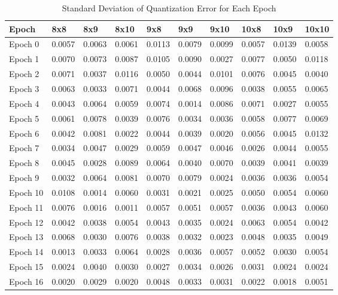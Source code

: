 \begin{table}[htbp]
\centering
\caption{Standard Deviation of Quantization Error for Each Epoch}
\begin{tabular}{|l|l|l|l|l|l|l|l|l|l|}
\hline
Epoch & 8x8 & 8x9 & 8x10 & 9x8 & 9x9 & 9x10 & 10x8 & 10x9 & 10x10 \\
\hline
Epoch 0 & 0.0057 & 0.0063 & 0.0061 & 0.0113 & 0.0079 & 0.0099 & 0.0057 & 0.0139 & 0.0058  \\
Epoch 1 & 0.0070 & 0.0073 & 0.0087 & 0.0105 & 0.0090 & 0.0027 & 0.0077 & 0.0050 & 0.0118  \\
Epoch 2 & 0.0071 & 0.0037 & 0.0116 & 0.0050 & 0.0044 & 0.0101 & 0.0076 & 0.0045 & 0.0040  \\
Epoch 3 & 0.0063 & 0.0033 & 0.0071 & 0.0044 & 0.0068 & 0.0096 & 0.0038 & 0.0055 & 0.0065  \\
Epoch 4 & 0.0043 & 0.0064 & 0.0059 & 0.0074 & 0.0014 & 0.0086 & 0.0071 & 0.0027 & 0.0055  \\
Epoch 5 & 0.0061 & 0.0078 & 0.0039 & 0.0076 & 0.0034 & 0.0036 & 0.0058 & 0.0077 & 0.0069  \\
Epoch 6 & 0.0042 & 0.0081 & 0.0022 & 0.0044 & 0.0039 & 0.0020 & 0.0056 & 0.0045 & 0.0132  \\
Epoch 7 & 0.0034 & 0.0047 & 0.0029 & 0.0059 & 0.0047 & 0.0046 & 0.0026 & 0.0044 & 0.0055  \\
Epoch 8 & 0.0045 & 0.0028 & 0.0089 & 0.0064 & 0.0040 & 0.0070 & 0.0039 & 0.0041 & 0.0039  \\
Epoch 9 & 0.0032 & 0.0064 & 0.0081 & 0.0070 & 0.0079 & 0.0024 & 0.0036 & 0.0036 & 0.0054  \\
Epoch 10 & 0.0108 & 0.0014 & 0.0060 & 0.0031 & 0.0021 & 0.0025 & 0.0050 & 0.0054 & 0.0060  \\
Epoch 11 & 0.0076 & 0.0016 & 0.0011 & 0.0057 & 0.0051 & 0.0057 & 0.0036 & 0.0043 & 0.0060  \\
Epoch 12 & 0.0042 & 0.0038 & 0.0054 & 0.0043 & 0.0035 & 0.0024 & 0.0063 & 0.0054 & 0.0042  \\
Epoch 13 & 0.0068 & 0.0030 & 0.0076 & 0.0038 & 0.0032 & 0.0023 & 0.0048 & 0.0035 & 0.0049  \\
Epoch 14 & 0.0013 & 0.0033 & 0.0064 & 0.0028 & 0.0036 & 0.0057 & 0.0052 & 0.0030 & 0.0054  \\
Epoch 15 & 0.0024 & 0.0040 & 0.0030 & 0.0027 & 0.0034 & 0.0026 & 0.0031 & 0.0024 & 0.0024  \\
Epoch 16 & 0.0020 & 0.0029 & 0.0020 & 0.0048 & 0.0033 & 0.0031 & 0.0022 & 0.0018 & 0.0051  \\

\end{tabular}
\end{table}
